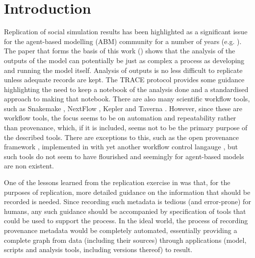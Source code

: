\documentclass[runningheads]{llncs}
\begin{document}
\section{Introduction}

Replication of social simulation results has been highlighted as a significant
issue for the agent-based modelling (ABM) community for a number of years (e.g. \cite{edmonds2003replication}).
The paper that forms the basis of this work (\cite{polhill2017lessons}) shows that
the analysis of the outputs of the model can potentially be just as complex a
process as developing and running the model itself. Analysis of outputs is no less difficult
to replicate unless adequate records are kept. The TRACE protocol \cite{schmolke2010ecological,ayllon2021keeping} provides
some guidance highlighting the need to keep a notebook of the analysis done and
a standardised approach to making that notebook. There are also 
many scientific workflow tools, such as Snakemake
\cite{koster2012snakemake}, NextFlow \cite{di2017nextflow}, Kepler
\cite{ludascher2006scientific} and Taverna \cite{hull2006taverna}. However, since
these are workflow tools, the focus seems to be  on automation and
repeatability rather than provenance, which, if it is included, seems not to be the primary purpose of the described tools. There are exceptions to this, such as the open provenance framework \cite{moreau2008open}, implemented in \cite{gadelha2011provenance} with yet another workflow control langauge \cite{zhao2007swift}, but such tools do not seem to have flourished and seemingly for agent-based models are non existent.

One of the lessons learned from the replication exercise in
\cite{polhill2017lessons} was that, for the purposes of replication, more
detailed guidance on the information that should be recorded is needed. Since
recording such metadata is tedious (and error-prone) for humans, any such
guidance should be accompanied by specification of tools
that could be used to support the process. In the ideal world, the process
of recording provenance metadata would be completely automated, essentially providing a complete graph from data (including their sources) through applications (model, scripts and analysis tools, including versions thereof) to result.
\end{document}
